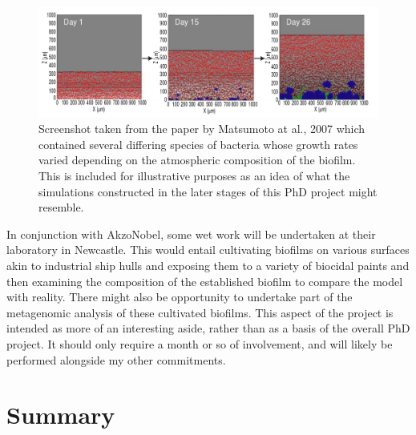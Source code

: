 \documentclass[a4paper,12pt]{article}
\begin{document}
\begin{figure}[H]
 \centering
 \includegraphics[width=16.4cm]{Matsumoto-biofilm-simulation}
 \caption{Screenshot taken from the paper by Matsumoto at al., 2007 \cite{bioref:Matsumoto-sim-snapshot-2007} which contained several differing species of bacteria whose growth rates 
 varied depending on the atmospheric composition of the biofilm.  This is included for illustrative purposes as an idea of what the simulations constructed in the later 
 stages of this PhD project might resemble.}
 \label{fig:Matsumoto-sim-snapshot}
\end{figure}

In conjunction with AkzoNobel, some wet work will be undertaken at their laboratory in Newcastle.  This would entail cultivating biofilms on various surfaces akin to industrial 
ship hulls and exposing them to a variety of biocidal paints and then examining the composition of the established biofilm to compare the model with reality.  There might also 
be opportunity to undertake part of the metagenomic analysis of these cultivated biofilms.  This aspect of the project is intended as more of an interesting aside, rather than 
as a basis of the overall PhD project.  It should only require a month or so of involvement, and will likely be performed alongside my other commitments. 

% 
% 
 
\section{Summary}
\end{document}
